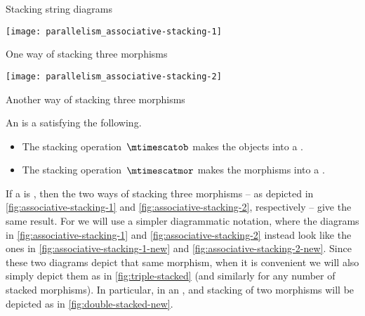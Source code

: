 \begin{marginfigure}
    \centering
    \caption{Stacking string diagrams}
    \label{fig:stacked-morphisms-diagram}
\end{marginfigure}

\begin{marginfigure}[]
    \centering
    \texttt{[image: parallelism\_associative-stacking-1]}
    \caption{One way of stacking three morphisms}
    \label{fig:associative-stacking-1}
\end{marginfigure}

\begin{marginfigure}
    \centering
    \texttt{[image: parallelism\_associative-stacking-2]}
    \caption{Another way of stacking three morphisms}
    \label{fig:associative-stacking-2}
\end{marginfigure}

\begin{ctdefinition}
    \label{def:stacking-semi-cat}
    An  is a  satisfying the following.

    \condit
    \begin{itemize}
        \item The stacking operation~$\mtimescatob$ makes the objects into a .
        \item The stacking operation~$\mtimescatmor$ makes the morphisms into a .
    \end{itemize}
\end{ctdefinition}

If a  is , then the two ways of stacking three morphisms -- as depicted in \cref{fig:associative-stacking-1} and \cref{fig:associative-stacking-2}, respectively -- give the same result.
For   we will use a simpler diagrammatic notation, where the diagrams in \cref{fig:associative-stacking-1} and \cref{fig:associative-stacking-2} instead look like the ones in \cref{fig:associative-stacking-1-new} and \cref{fig:associative-stacking-2-new}.
Since these two diagrams depict that same morphism, when it is convenient we will also simply depict them as in \cref{fig:triple-stacked} (and similarly for any number of stacked morphisms).
In particular, in an  , and stacking of two morphisms will be depicted as in \cref{fig:double-stacked-new}.

